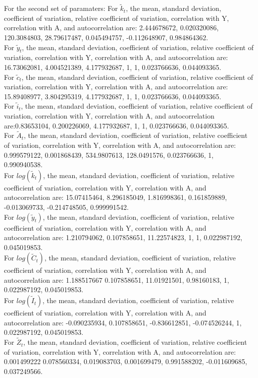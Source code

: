 \documentclass{amsart}
\theoremstyle{plain}
\begin{document}
For the second set of paramaters:
For $\tilde{k}_t$, the mean, standard deviation, coefficient of variation, relative coefficient of variation, correlation with Y, correlation with A, and autocorrelation are: 2.444678672,	0.020320086,	120.3084803,	28.79617487,	0.045494757,	-0.112648907,	0.984864362.\\
For $\tilde{y}_t$, the mean, standard deviation, coefficient of variation, relative coefficient of variation, correlation with Y, correlation with A, and autocorrelation are: 16.73062081,	4.004521389,	4.177932687,	1,	1,	0.023766636,	0.044093365.
\\
For $\tilde{c}_t$, the mean, standard deviation, coefficient of variation, relative coefficient of variation, correlation with Y, correlation with A, and autocorrelation are: 15.89408977,	3.804295319,	4.177932687,	1,	1,	0.023766636,	0.044093365.
\\
For $\tilde{i}_t$, the mean, standard deviation, coefficient of variation, relative coefficient of variation, correlation with Y, correlation with A, and autocorrelation are:0.83653104,	0.200226069,	4.177932687,	1,	1,	0.023766636,	0.044093365.\\
For $\tilde{A}_t$, the mean, standard deviation, coefficient of variation, relative coefficient of variation, correlation with Y, correlation with A, and autocorrelation are: 0.999579122,	0.001868439,	534.9807613,	128.0491576,	0.023766636,	1,	0.990940538.\\
For $log(\tilde{k}_t)$, the mean, standard deviation, coefficient of variation, relative coefficient of variation, correlation with Y, correlation with A, and autocorrelation are: 15.07415464,	8.296185049,	1.816998361,	0.161859889,	-0.013069733,	-0.214748505,	0.999991542.\\
For $log(\tilde{y}_t)$, the mean, standard deviation, coefficient of variation, relative coefficient of variation, correlation with Y, correlation with A, and autocorrelation are: 1.210794062,	0.107858651,	11.22574823,	1,	1,	0.022987192,	0.045019853.\\
For $log(\tilde{C}_t)$, the mean, standard deviation, coefficient of variation, relative coefficient of variation, correlation with Y, correlation with A, and autocorrelation are: 1.188517667	0.107858651,	11.01921501,	0.98160183,	1,	0.022987192,	0.045019853.\\
For $log(\tilde{I}_t)$, the mean, standard deviation, coefficient of variation, relative coefficient of variation, correlation with Y, correlation with A, and autocorrelation are: -0.090235934,	0.107858651,	-0.836612851,	-0.074526244,	1,	0.022987192,	0.045019853.\\
For $\tilde{Z}_t$, the mean, standard deviation, coefficient of variation, relative coefficient of variation, correlation with Y, correlation with A, and autocorrelation are: 0.001499222	0.078560334,	0.019083703,	0.001699479,	0.991588202,	-0.011609685,	0.037249566.\\
\end{document}
